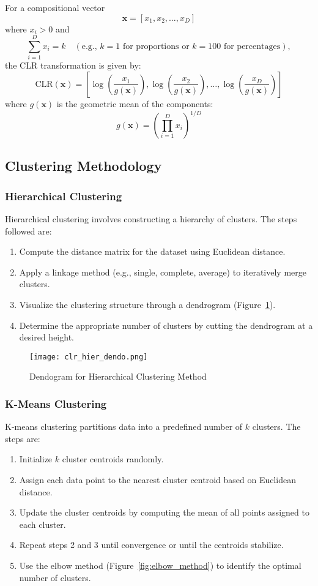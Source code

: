\documentclass[a4paper,12pt]{article}
\begin{document}
For a compositional vector 
\[
\mathbf{x} = [x_1, x_2, \dots, x_D]
\]
where \( x_i > 0 \) and 
\[
\sum_{i=1}^{D} x_i = k \quad (\text{e.g., } k = 1 \text{ for proportions or } k = 100 \text{ for percentages}),
\]
the CLR transformation is given by:
\[
\text{CLR}(\mathbf{x}) = \left[ \log \left( \frac{x_1}{g(\mathbf{x})} \right), \log \left( \frac{x_2}{g(\mathbf{x})} \right), \dots, \log \left( \frac{x_D}{g(\mathbf{x})} \right) \right]
\]
where \( g(\mathbf{x}) \) is the geometric mean of the components:
\[
g(\mathbf{x}) = \left( \prod_{i=1}^{D} x_i \right)^{1/D}
\]


\subsection{Clustering Methodology}
\label{appendix:clustering_methodology}

\subsubsection{Hierarchical Clustering}
Hierarchical clustering involves constructing a hierarchy of clusters. The steps followed are:
\begin{enumerate}
    \item Compute the distance matrix for the dataset using Euclidean distance.
    \item Apply a linkage method (e.g., single, complete, average) to iteratively merge clusters.
    \item Visualize the clustering structure through a dendrogram (Figure~\ref{fig:hierarchical-dendrogram}).
    \item Determine the appropriate number of clusters by cutting the dendrogram at a desired height.
\end{enumerate}

\begin{figure} [H]
    \centering
    \texttt{[image: clr\_hier\_dendo.png]}
    \caption{Dendogram for Hierarchical Clustering Method}
    \label{fig:hierarchical-dendrogram}
\end{figure}

\subsubsection{K-Means Clustering}
K-means clustering partitions data into a predefined number of \(k\) clusters. The steps are:
\begin{enumerate}
    \item Initialize \(k\) cluster centroids randomly.
    \item Assign each data point to the nearest cluster centroid based on Euclidean distance.
    \item Update the cluster centroids by computing the mean of all points assigned to each cluster.
    \item Repeat steps 2 and 3 until convergence or until the centroids stabilize.
    \item Use the elbow method (Figure~\ref{fig:elbow_method}) to identify the optimal number of clusters.
\end{enumerate}
\end{document}
